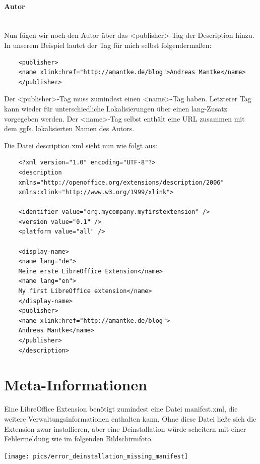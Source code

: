 \documentclass[12pt,a4paper,titlepage]{book}
\begin{document}
\paragraph*{Autor}$~~$\\

Nun fügen wir noch den Autor über das <publisher>-Tag der Description hinzu. In unserem Beispiel lautet der Tag für mich selbst folgendermaßen:
\begin{lstlisting}
	<publisher>
	<name xlink:href="http://amantke.de/blog">Andreas Mantke</name>
	</publisher>
\end{lstlisting}
Der <publisher>-Tag muss zumindest einen <name>-Tag haben. Letzterer Tag kann wieder für unterschiedliche Lokalisierungen über einen lang-Zusatz vorgegeben werden. Der <name>-Tag selbst enthält eine URL zusammen mit dem ggfs. lokalisierten Namen des Autors.

Die Datei description.xml sieht nun wie folgt aus:
\begin{lstlisting}
	<?xml version="1.0" encoding="UTF-8"?>
	<description
	xmlns="http://openoffice.org/extensions/description/2006"
	xmlns:xlink="http://www.w3.org/1999/xlink">
	
	<identifier value="org.mycompany.myfirstextension" />
	<version value="0.1" />
	<platform value="all" />
	
	<display-name>
	<name lang="de">
	Meine erste LibreOffice Extension</name>
	<name lang="en">
	My first LibreOffice extension</name>
	</display-name>
	<publisher>
	<name xlink:href="http://amantke.de/blog">
	Andreas Mantke</name>
	</publisher>    
	</description>
\end{lstlisting}

\section{Meta-Informationen}

Eine LibreOffice Extension benötigt zumindest eine Datei manifest.xml, die weitere Verwaltungsinformationen enthalten kann. Ohne diese Datei ließe sich die Extension zwar installieren, aber eine Deinstallation würde scheitern mit einer Fehlermeldung wie im folgenden Bildschirmfoto.
\begin{center}
	\captionsetup{type=figure}
	\texttt{[image: pics/error\_deinstallation\_missing\_manifest]}
	\label{fig:error_deinstallation_missing_manifest}
\end{center}
\end{document}
